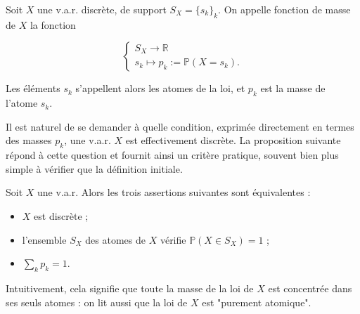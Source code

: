 \begin{mdframed}
\begin{definition}
Soit $X$ une v.a.r. discrète, de support $S_X = \{s_k\}_k$. On appelle fonction de masse de $X$ la fonction

$$
\begin{cases} S_X \to \mathbb{R} \\ s_k \mapsto p_k := \mathbb{P}(X = s_k). \end{cases}
$$

Les éléments $s_k$ s'appellent alors les atomes de la loi, et $p_k$ est la masse de l'atome $s_k$.
\end{definition}
\end{mdframed}

\medskip

Il est naturel de se demander à quelle condition, exprimée directement en termes des masses $p_k$, une v.a.r. $X$ est effectivement discrète. La proposition suivante répond à cette question et fournit ainsi un critère pratique, souvent bien plus simple à vérifier que la définition initiale.

\begin{mdframed}
\begin{proposition}
Soit $X$ une v.a.r. Alors les trois assertions suivantes sont équivalentes :
\begin{itemize}
\item $X$ est discrète ;
\item l'ensemble $S_X$ des atomes de $X$ vérifie $\mathbb{P}(X \in S_X) = 1$ ;
\item $\sum_k p_k = 1$.
\end{itemize}
\end{proposition}
\end{mdframed}


Intuitivement, cela signifie que toute la masse de la loi de $X$ est concentrée dans ses seuls atomes : on lit aussi que la loi de $X$ est "purement atomique".

